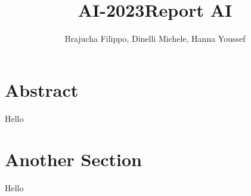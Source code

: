 \title{AI-2023}\documentclass[12pt,a4paper,twoside]{article}
\author{Brajucha Filippo, Dinelli Michele, Hanna Youssef}
\title{Report AI}
\begin{document}
\maketitle

\section*{Abstract}
Hello

\newpage

\tableofcontents

\newpage

\section{Another Section}
Hello
\end{document}

